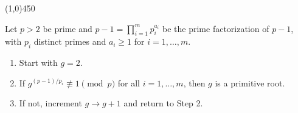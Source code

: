 \begin{center}
    \vspace{10pt}
    \line(1,0){450}
    \vspace{25pt}
\end{center}

\begin{algorithm}
    Let $p>2$ be prime and $p-1 = \prod_{i=1}^{m}p_{i}^{a_{i}}$ be the prime factorization of $p-1$, with $p_{i}$ distinct primes and $a_{i} \geq 1$ for $i=1, \dots, m$.
    \begin{enumerate}
        \item Start with $g=2$.
        \item If $g^{(p-1)/p_{i}} \not\equiv 1 \pmod{p}$ for all $i=1, \dots, m$, then $g$ is a primitive root.
        \item If not, increment $g \rightarrow g+1$ and return to Step 2.
    \end{enumerate}
\end{algorithm}